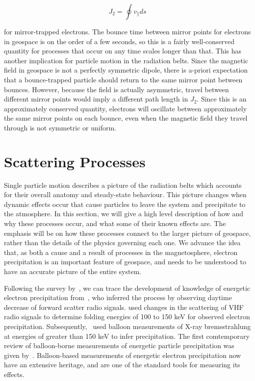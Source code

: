 $$J_2 = \oint v_{\parallel}ds$$

for mirror-trapped electrons. The bounce time between mirror points for electrons in geospace is on the order of a few seconds, so this is a fairly well-conserved quantity for processes that occur on any time scales longer than that. This has another implication for particle motion in the radiation belts. Since the magnetic field in geospace is not a perfectly symmetric dipole, there is a-priori expectation that a bounce-trapped particle should return to the same mirror point between bounces. However, because the field is actually asymmetric, travel between different mirror points would imply a different path length in $J_2$. Since this is an approximately conserved quantity, electrons will oscillate between approximately the same mirror points on each bounce, even when the magnetic field they travel through is not symmetric or uniform.

\section{Scattering Processes}

Single particle motion describes a picture of the radiation belts which accounts for their overall anatomy and steady-state behaviour. This picture changes when dynamic effects occur that cause particles to leave the system and precipitate to the atmosphere. In this section, we will give a high level description of how and why these processes occur, and what some of their known effects are. The emphasis will be on how these processes connect to the larger picture of geospace, rather than the details of the physics governing each one. We advance the idea that, as both a cause and a result of processes in the magnetosphere, electron precipitation is an important feature of geospace, and needs to be understood to have an accurate picture of the entire system. 

Following the survey by~\cite{Millan2007a}, we can trace the development of knowledge of energetic electron precipitation from~\cite{Bailey1968}, who inferred the process by observing daytime decrease of forward scatter radio signals. \cite{rosenberg1972} used changes in the scattering of VHF radio signals to determine folding energies of 100 to 150 keV for observed electron precipitation. Subsequently,~\cite{parks1979} used balloon measurements of X-ray bremsstrahlung at energies of greater than 150 keV to infer precipitation. The first comtemporary review of balloon-borne measurements of energetic particle precipitation was given by~\cite{parks1993}. Balloon-based measurements of energetic electron precipitation now have an extensive heritage, and are one of the standard tools for measuring its effects. 

